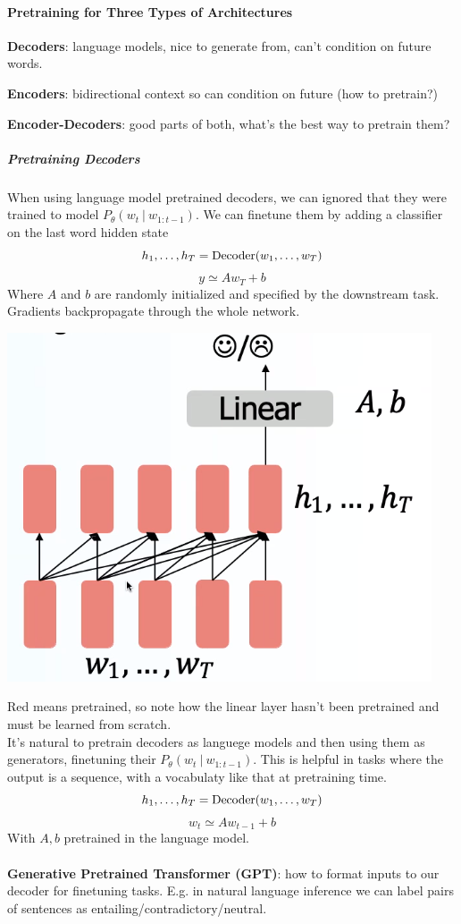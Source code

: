 \documentclass[10pt]{report}
\begin{document}
\paragraph{Pretraining for Three Types of Architectures}
\begin{list}{}{}
	\item \textbf{Decoders}: language models, nice to generate from, can't condition on future words.
	\item \textbf{Encoders}: bidirectional context so can condition on future (how to pretrain?)
	\item \textbf{Encoder-Decoders}: good parts of both, what's the best way to pretrain them?
\end{list}
\subparagraph{Pretraining Decoders} When using language model pretrained decoders, we can ignored that they were trained to model $P_\theta(w_t\:|\:w_{1:t-1})$. We can finetune them by adding a classifier on the last word hidden state
$$h_1,\ldots,h_T = \hbox{Decoder}(w_1,\ldots,w_T)$$
$$y\simeq Aw_T + b$$
Where $A$ and $b$ are randomly initialized and specified by the downstream task. Gradients backpropagate through the whole network.\begin{center}
	\includegraphics[scale=0.5]{75.png}
\end{center}
Red means pretrained, so note how the linear layer hasn't been pretrained and must be learned from scratch.\\
It's natural to pretrain decoders as languege models and then using them as generators, finetuning their $P_\theta(w_t\:|\:w_{1:t-1})$. This is helpful in tasks where the output is a sequence, with a vocabulaty like that at pretraining time.
$$h_1,\ldots,h_T = \hbox{Decoder}(w_1,\ldots,w_T)$$
$$w_t\simeq Aw_{t-1} + b$$
With $A,b$ pretrained in the language model.\\\\
\textbf{Generative Pretrained Transformer (GPT)}: how to format inputs to our decoder for finetuning tasks. E.g. in natural language inference we can label pairs of sentences as entailing/contradictory/neutral.
\end{document}

